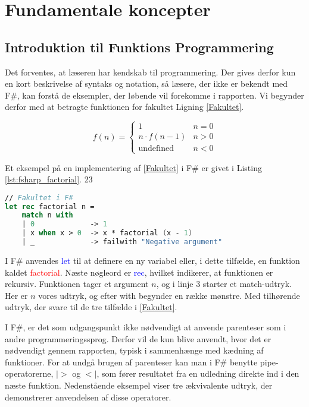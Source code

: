 
\section{Fundamentale koncepter}
\subsection{Introduktion til Funktions Programmering}
Det forventes, at læseren har kendskab til programmering. Der gives derfor kun en kort beskrivelse af syntaks og notation, så læsere, der ikke er bekendt med F\#, kan forstå de eksempler, der løbende vil forekomme i rapporten. Vi begynder derfor med at betragte funktionen for fakultet Ligning \eqref{Fakultet}.

\begin{equation}
    \label{Fakultet}
    f(n) = \begin{cases} 
            1 &  n = 0  \\
            n \cdot f(n-1) & n > 0 \\
            \text{undefined} & n < 0 
           \end{cases}
\end{equation}

Et eksempel på en implementering af \eqref{Fakultet} i F\# er givet i Listing \ref{lst:fsharp_factorial}.
23

\begin{lstlisting}[language={FSharp}, label={lst:fsharp_factorial}, caption={Eksempel på Fakultet i F\#}]
// Fakultet i F#
let rec factorial n =
    match n with
    | 0             -> 1 
    | x when x > 0  -> x * factorial (x - 1)
    | _             -> failwith "Negative argument"
\end{lstlisting}

I F\# anvendes \textcolor{blue}{let} til at definere en ny variabel eller, i dette tilfælde, en funktion kaldet \textcolor{red}{factorial}. Næste nøgleord er \textcolor{blue}{rec}, hvilket indikerer, at funktionen er rekursiv. Funktionen tager et argument \(n\), og i linje 3 starter et match-udtryk. Her er \(n\) vores udtryk, og efter \textcolor{codepurple}{with} begynder en række mønstre. Med tilhørende udtryk, der svare til de tre tilfælde i \eqref{Fakultet}. 
    
I F\#, er det som udgangspunkt ikke nødvendigt at anvende parenteser som i andre programmeringssprog. Derfor vil de kun blive anvendt, hvor det er nødvendigt gennem rapporten, typisk i sammenhænge med kædning af funktioner. For at undgå brugen af parenteser kan man i F\# benytte pipe-operatorerne, $|>$ og $<|$, som fører resultatet fra en udledning direkte ind i den næste funktion. Nedenstående eksempel viser tre ækvivalente udtryk, der demonstrerer anvendelsen af disse operatorer.

